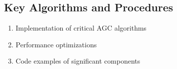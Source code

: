 \subsection{Key Algorithms and Procedures}

\begin{enumerate}
    \item Implementation of critical AGC algorithms
    \item Performance optimizations
    \item Code examples of significant components 
\end{enumerate}
